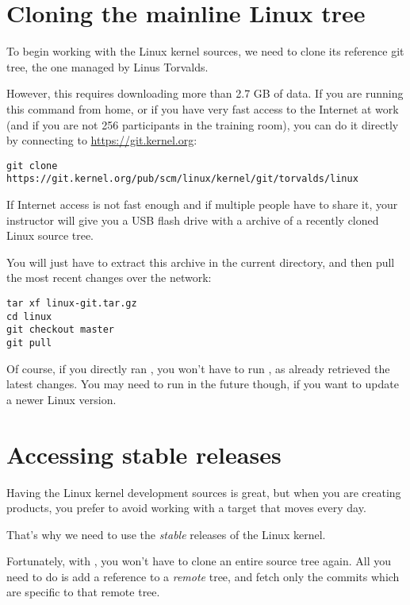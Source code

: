 \section{Cloning the mainline Linux tree}

To begin working with the Linux kernel sources, we need to clone its
reference git tree, the one managed by Linus Torvalds.

However, this requires downloading more than 2.7 GB of data. If you
are running this command from home, or if you have very fast access to
the Internet at work (and if you are not 256 participants in the
training room), you can do it directly by connecting to
\url{https://git.kernel.org}:

{\small
\begin{verbatim}
git clone https://git.kernel.org/pub/scm/linux/kernel/git/torvalds/linux
\end{verbatim}
}

If Internet access is not fast enough and if multiple people have to
share it, your instructor will give you a USB flash drive with a
 archive of a recently cloned Linux source tree.

You will just have to extract this archive in the current directory,
and then pull the most recent changes over the network:

\begin{verbatim}
tar xf linux-git.tar.gz
cd linux
git checkout master
git pull
\end{verbatim}

Of course, if you directly ran
, you won't have to run , as
 already retrieved the latest changes. You may need to
run  in the future though, if you want to update a
newer Linux version.

\section{Accessing stable releases}

Having the Linux kernel development sources is great, but when you are
creating products, you prefer to avoid working with a target that moves
every day.

That's why we need to use the {\em stable} releases of the Linux
kernel.

Fortunately, with , you won't have to clone an entire source
tree again. All you need to do is add a reference to a {\em remote}
tree, and fetch only the commits which are specific to that remote tree.

